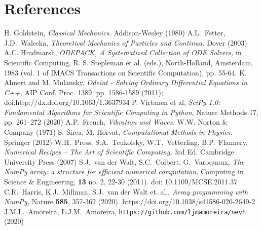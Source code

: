 \documentclass{iopart}
\begin{document}
\section*{References}
\begin{thebibliography}{99}
   H. Goldstein, \textsl{Classical Mechanics.} Addison-Wesley
  (1980)
%
    A.L.~Fetter, J.D.~Walecka,
    \textsl{Theoretical Mechanics of Particles and Continua.}
    Dover (2003)
%
  A.C. Hindmarsh, \textsl{ODEPACK, A Systematized Collection of ODE Solvers,} in
    Scientific Com\-puting, R. S. Stepleman et al. (eds.), North-Holland,
    Amsterdam, 1983 (vol. 1 of IMACS Transactions on Scientific Computation),
    pp. 55-64. 
%
  K. Ahnert and M. Mulansky, \textsl{Odeint - Solving Ordinary Differential
  Equations in C++,} AIP Conf. Proc. 1389, pp. 1586-1589 (2011);
doi:http://dx.doi.org/10.1063/1.3637934
%
  P. Virtanen et al, \textsl{SciPy 1.0: Fundamental Algorithms for Scientific
  Computing in Python}, Nature Methods 17, pp. 261--272 (2020)
%
   A.P.~French, \textsl{Vibration and Waves.} W.W. Norton \&
  Company (1971)
%
   S. \v{S}irca, M. Horvat, \textsl{Computational Methods in
  Physics.} Springer (2012)
%
   W.H.~Press, S.A.~Teukolsky, W.T.~Vetterling, B.P.~Flannery,
  \textsl{Numerical Recipes -- The Art of Scientific Computing,} 3rd Ed.
  Cambridge University Press (2007)
%
   S.J.~van der Walt, S.C.~Colbert, G.~Varoquaux,
  \textsl{The NumPy array: a structure for efficient numerical computation,}
  Computing in Science \& Engineering, \textbf{13} no. 2, 22-30 (2011).
  doi: 10.1109/MCSE.2011.37
%
   C.R.~Harris, K.J.~Millman, S.J.~van der Walt et. al.,
  \textsl{Array programming with NumPy,} Nature \textbf{585}, 357-362 (2020).
  https://doi.org/10.1038/s41586-020-2649-2
%
   J.M.L.~Amoreira, L.J.M.~Amoreira,
  \texttt{https://github.com/ljmamoreira/nevh} (2020)

\end{thebibliography}
\end{document}

